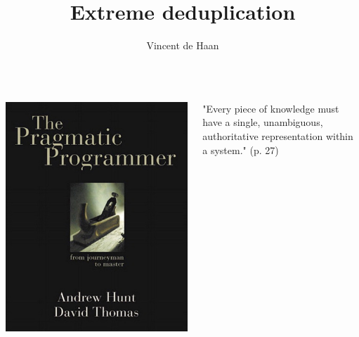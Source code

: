 \documentclass[aspectratio=169]{beamer}
\title{Extreme deduplication}
\author{Vincent de Haan}
\date{}
\begin{document}
\begin{frame}
\maketitle

\end{frame}

\begin{frame}
\begin{columns}
\begin{column}{0.4\textwidth}
\includegraphics[width=\textwidth]{the-pragmatic-programmer-from-journeyman-to-master-1.jpg}
\end{column}
\pause
\begin{column}{0.6\textwidth}
"Every piece of knowledge must have a single, unambiguous, authoritative representation within a system." (p. 27)
\end{column}
\end{columns}
\end{frame}
\end{document}
